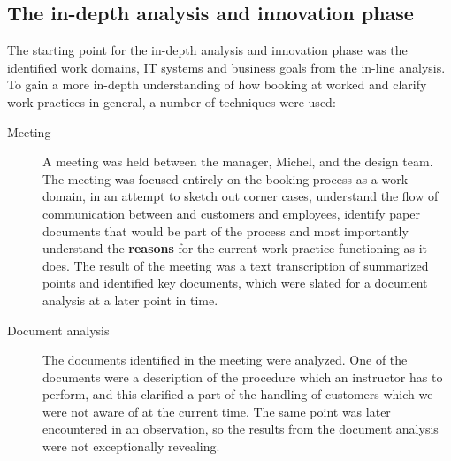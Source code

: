 \subsection{The in-depth analysis and innovation phase}
The starting point for the in-depth analysis and innovation phase was the
identified work domains, IT systems and business goals from the in-line
analysis.  To gain a more in-depth understanding of how booking at \gomonkey{}
worked and clarify work practices in general, a number of techniques were used:

\begin{description}
    \item [Meeting] A meeting was held
        between the manager, Michel, and the design team. The meeting was
        focused entirely on the booking process as a work domain, in an attempt
        to sketch out corner cases, understand the flow of communication between
        \gomonkey{} and customers and employees, identify paper documents that
        would be part of the process and most importantly understand the
        \textbf{reasons} for the current work practice functioning as it does.
        The result of the meeting was a text transcription of summarized points
        and identified key documents, which were slated for a document analysis
        at a later point in time. 

    \item [Document analysis] The documents identified in the meeting were
        analyzed. One of the documents were a description of the procedure
	which an instructor has to perform, and this clarified a part of the
	handling of customers which we were not aware of at the current time. 
	The same point was later encountered in an observation, so the results 
	from the document analysis were not exceptionally revealing.


\end{description}
